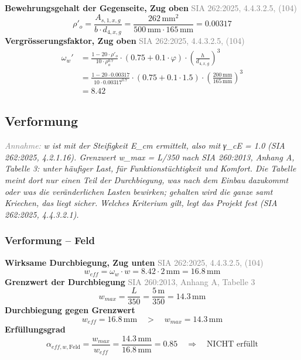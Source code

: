 \documentclass[11pt,a4paper]{article}
\newcommand{\normref}[1]{{\small\textcolor{gray}{#1}}}
\newcommand{\hinweis}[2]{\par\noindent\textcolor{gray}{\textit{#1:}} \textit{#2}\par}
\begin{document}
\noindent\textbf{Bewehrungsgehalt der Gegenseite, Zug oben} \hfill \normref{SIA 262:2025, 4.4.3.2.5, (104)}
\begin{equation*}
\rho'_{o} = \frac{A_{s,1,x,g}}{b \cdot d_{4,x,g}} = \frac{262\,\mathrm{mm}^{2}}{500\,\mathrm{mm} \cdot 165\,\mathrm{mm}} = 0.00317
\end{equation*}
\noindent\textbf{Vergrösserungsfaktor, Zug oben} \hfill \normref{SIA 262:2025, 4.4.3.2.5, (104)}
\begin{equation*}
\begin{aligned}
  \omega_w' &= \frac{1 - 20 \cdot \rho'_{o}}{10 \cdot \rho_{o}^{0.7}} \cdot \left(0.75 + 0.1 \cdot \varphi\right) \cdot \left(\frac{h}{d_{4,x,g}}\right)^{3} \\
  &= \frac{1 - 20 \cdot 0.00317}{10 \cdot 0.00317^{0.7}} \cdot \left(0.75 + 0.1 \cdot 1.5\right) \cdot \left(\frac{200\,\mathrm{mm}}{165\,\mathrm{mm}}\right)^{3} \\
  &= 8.42
\end{aligned}
\end{equation*}
\subsection{Verformung}
\hinweis{Annahme}{w ist mit der Steifigkeit E\_cm ermittelt, also mit γ\_cE = 1.0 (SIA 262:2025, 4.2.1.16). Grenzwert w\_max = L/350 nach SIA 260:2013, Anhang A, Tabelle 3: unter häufiger Last, für Funktionstüchtigkeit und Komfort. Die Tabelle meint dort nur einen Teil der Durchbiegung, was nach dem Einbau dazukommt oder was die veränderlichen Lasten bewirken; gehalten wird die ganze samt Kriechen, das liegt sicher. Welches Kriterium gilt, legt das Projekt fest (SIA 262:2025, 4.4.3.2.1).}
\subsubsection{Verformung – Feld}
\noindent\textbf{Wirksame Durchbiegung, Zug unten} \hfill \normref{SIA 262:2025, 4.4.3.2.5, (104)}
\begin{equation*}
w_{eff} = \omega_w \cdot w = 8.42 \cdot 2\,\mathrm{mm} = 16.8\,\mathrm{mm}
\end{equation*}
\noindent\textbf{Grenzwert der Durchbiegung} \hfill \normref{SIA 260:2013, Anhang A, Tabelle 3}
\begin{equation*}
w_{max} = \frac{L}{350} = \frac{5\,\mathrm{m}}{350} = 14.3\,\mathrm{mm}
\end{equation*}
\noindent\textbf{Durchbiegung gegen Grenzwert}
\begin{equation*}
w_{eff} = 16.8\,\mathrm{mm} \quad > \quad w_{max} = 14.3\,\mathrm{mm}
\end{equation*}
\noindent\textbf{Erfüllungsgrad}
\begin{equation*}
\alpha_{eff,w,\text{Feld}} = \frac{w_{max}}{w_{eff}} = \frac{14.3\,\mathrm{mm}}{16.8\,\mathrm{mm}} = 0.85 \quad \Rightarrow \quad \text{NICHT erfüllt}
\end{equation*}
\end{document}
